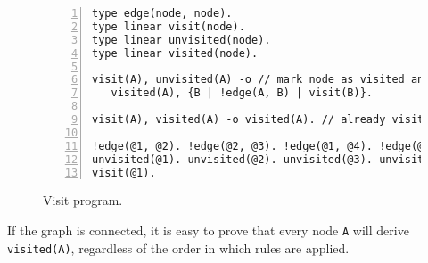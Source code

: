 \begin{figure}[h!]
\small\begin{Verbatim}[numbers=left]
type edge(node, node).
type linear visit(node).
type linear unvisited(node).
type linear visited(node).

visit(A), unvisited(A) -o // mark node as visited and visit neighbors
   visited(A), {B | !edge(A, B) | visit(B)}.

visit(A), visited(A) -o visited(A). // already visited

!edge(@1, @2). !edge(@2, @3). !edge(@1, @4). !edge(@2, @4).
unvisited(@1). unvisited(@2). unvisited(@3). unvisited(@4).
visit(@1).
\end{Verbatim}
  \caption{Visit program.}
  \label{code:visit}
\end{figure}
\normalsize

If the graph is connected, it is easy to prove that every node \texttt{A} will derive \texttt{visited(A)},
regardless of the order in which rules are applied.
